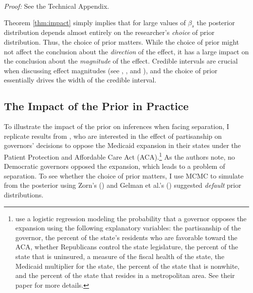 \documentclass[12pt]{article}
\begin{document}
\noindent \textit{Proof:} See the Technical Appendix.

Theorem \ref{thm:impact} simply implies that for large values of $\beta_s$ the posterior distribution depends almost entirely on the researcher's \emph{choice} of prior distribution. Thus, the choice of prior matters. While the choice of prior might not affect the conclusion about the \emph{direction} of the effect, it has a large impact on the conclusion about the \emph{magnitude} of the effect. Credible intervals are crucial when discussing effect magnitudes (see \citealt{Rainey2014}, \citealt{Gross2014}, and \citealt{McCaskeyRainey2014}), and the choice of prior essentially drives the width of the credible interval.

%

\subsection*{The Impact of the Prior in Practice}

To illustrate the impact of the prior on inferences when facing separation, I replicate results from \cite{BarrilleauxRainey2014}, who are interested in the effect of partisanship on governors' decisions to oppose the Medicaid expansion in their states under the Patient Protection and Affordable Care Act (ACA).\footnote{\cite{BarrilleauxRainey2014} use a logistic regression modeling the probability that a governor opposes the expansion using the following explanatory variables: the partisanship of the governor, the percent of the state's residents who are favorable toward the ACA, whether Republicans control the state legislature, the percent of the state that is uninsured, a measure of the fiscal health of the state, the Medicaid multiplier for the state, the percent of the state that is nonwhite, and the percent of the state that resides in a metropolitan area. See their paper for more details.} As the authors note, no Democratic governors opposed the expansion, which leads to a problem of separation. To see whether the choice of prior matters, I use MCMC to simulate from the posterior using Zorn's (\citeyear{Zorn2005}) and Gelman et al.'s (\citeyear{Gelmanetal2008}) suggested \emph{default} prior distributions. 
\end{document}
